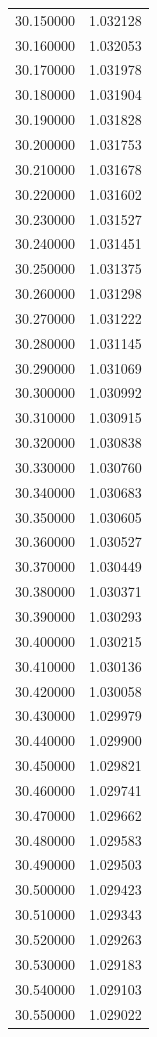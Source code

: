 \begin{tabular}{rr}
30.150000 & 1.032128 \\
30.160000 & 1.032053 \\
30.170000 & 1.031978 \\
30.180000 & 1.031904 \\
30.190000 & 1.031828 \\
30.200000 & 1.031753 \\
30.210000 & 1.031678 \\
30.220000 & 1.031602 \\
30.230000 & 1.031527 \\
30.240000 & 1.031451 \\
30.250000 & 1.031375 \\
30.260000 & 1.031298 \\
30.270000 & 1.031222 \\
30.280000 & 1.031145 \\
30.290000 & 1.031069 \\
30.300000 & 1.030992 \\
30.310000 & 1.030915 \\
30.320000 & 1.030838 \\
30.330000 & 1.030760 \\
30.340000 & 1.030683 \\
30.350000 & 1.030605 \\
30.360000 & 1.030527 \\
30.370000 & 1.030449 \\
30.380000 & 1.030371 \\
30.390000 & 1.030293 \\
30.400000 & 1.030215 \\
30.410000 & 1.030136 \\
30.420000 & 1.030058 \\
30.430000 & 1.029979 \\
30.440000 & 1.029900 \\
30.450000 & 1.029821 \\
30.460000 & 1.029741 \\
30.470000 & 1.029662 \\
30.480000 & 1.029583 \\
30.490000 & 1.029503 \\
30.500000 & 1.029423 \\
30.510000 & 1.029343 \\
30.520000 & 1.029263 \\
30.530000 & 1.029183 \\
30.540000 & 1.029103 \\
30.550000 & 1.029022 \\

\end{tabular}
